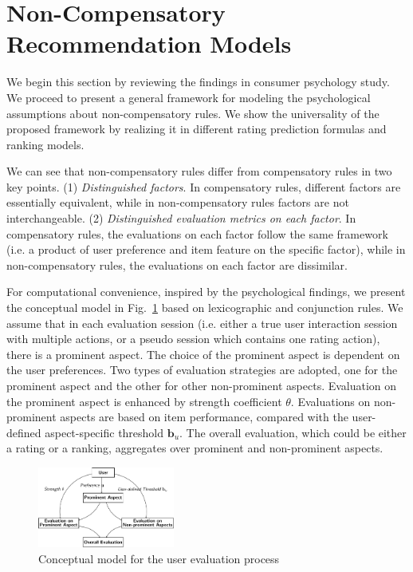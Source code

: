 \documentclass[letterpaper]{article} %
\begin{document}
\section{Non-Compensatory Recommendation Models}\label{sec:Nmodel}
We begin this section by reviewing the findings in consumer psychology study. We proceed to present a general framework for modeling the psychological assumptions about non-compensatory rules. We show the universality of the proposed framework by realizing it in different rating prediction formulas and ranking models.

We can see that non-compensatory rules differ from compensatory rules in two key points. (1) \textit{Distinguished factors}. In compensatory rules, different factors are essentially equivalent, while in non-compensatory rules factors are not interchangeable. (2) \textit{Distinguished evaluation metrics on each factor}. In compensatory rules, the evaluations on each factor follow the same framework (i.e. a product of user preference and item feature on the specific factor), while in non-compensatory rules, the evaluations on each factor are dissimilar.  

For computational convenience, inspired by the psychological findings, we present the conceptual model in Fig.~\ref{fig:model} based on lexicographic and conjunction rules. We assume that in each evaluation session (i.e. either a true user interaction session with multiple actions, or a pseudo session which contains one rating action), there is a prominent aspect. The choice of the prominent aspect is dependent on the user preferences. Two types of evaluation strategies are adopted, one for the prominent aspect and the other for other non-prominent aspects. Evaluation on the prominent aspect is enhanced by strength coefficient $\theta$. Evaluations on non-prominent aspects are based on item performance, compared with the user-defined aspect-specific threshold $\mathbf{b}_u$. The overall evaluation, which could be either a rating or a ranking, aggregates over prominent and non-prominent aspects. 

\begin{figure}[htbp]
\begin{center}
\includegraphics[width=0.4\textwidth]{conceptualmodel.pdf}
\caption{Conceptual model for the user evaluation process}
\label{fig:model}
\end{center}
\end{figure}
\end{document}
